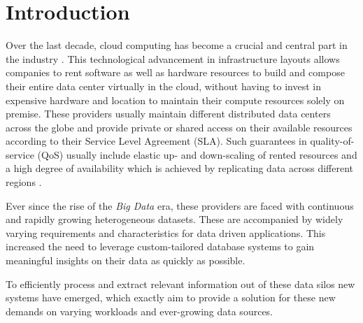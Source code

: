 \chapter{Introduction}
\label{c:intro}

Over the last decade, cloud computing has become a crucial and central part in the industry \cite{claremont:2005}.
This technological advancement in infrastructure layouts allows companies to rent software as well as hardware resources to
build and compose their entire data center virtually in the cloud,
without having to invest in expensive hardware and location to maintain their compute resources
solely on premise. These providers usually maintain different distributed data centers 
across the globe and provide private or shared access on their available resources according
to their Service Level Agreement (SLA). Such guarantees in quality-of-service (QoS) usually 
include elastic up- and down-scaling of rented resources and a high degree of availability 
which is achieved by replicating data across different regions \cite{terry:2013}. 

Ever since the rise of the \emph{Big Data} era, these providers are faced with continuous
and rapidly growing heterogeneous datasets. These are accompanied by widely varying requirements 
and characteristics for data driven applications. This increased the need to leverage custom-tailored 
database systems to gain meaningful insights on their data as quickly as possible.

To efficiently process and extract relevant information out of these data silos new systems
have emerged, which exactly aim to provide a solution for these new 
demands on varying workloads and ever-growing data sources.

